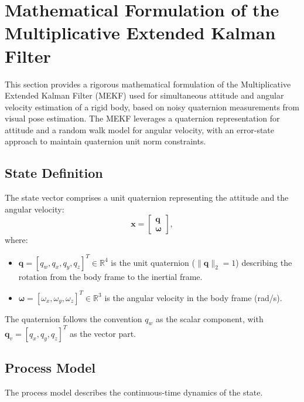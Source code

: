 \documentclass[11pt]{article}
\begin{document}
\section{Mathematical Formulation of the Multiplicative Extended Kalman Filter}
\label{sec:mekf_math}

This section provides a rigorous mathematical formulation of the Multiplicative Extended Kalman Filter (MEKF) used for simultaneous attitude and angular velocity estimation of a rigid body, based on noisy quaternion measurements from visual pose estimation. The MEKF leverages a quaternion representation for attitude and a random walk model for angular velocity, with an error-state approach to maintain quaternion unit norm constraints.

\subsection{State Definition}
The state vector comprises a unit quaternion representing the attitude and the angular velocity:
\[
\mathbf{x} = \begin{bmatrix} \mathbf{q} \\ \boldsymbol{\omega} \end{bmatrix},
\]
where:
\begin{itemize}
    \item \(\mathbf{q} = [q_w, q_x, q_y, q_z]^T \in \mathbb{R}^4\) is the unit quaternion (\(\|\mathbf{q}\|_2 = 1\)) describing the rotation from the body frame to the inertial frame.
    \item \(\boldsymbol{\omega} = [\omega_x, \omega_y, \omega_z]^T \in \mathbb{R}^3\) is the angular velocity in the body frame (rad/s).
\end{itemize}
The quaternion follows the convention \(q_w\) as the scalar component, with \(\mathbf{q}_v = [q_x, q_y, q_z]^T\) as the vector part.

\subsection{Process Model}
The process model describes the continuous-time dynamics of the state.
\end{document}
